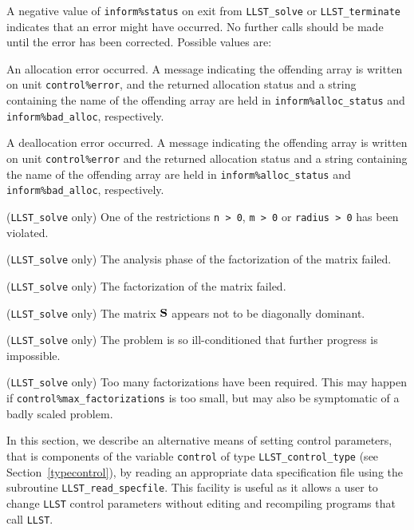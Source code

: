 \documentclass{galahad}
\newcommand{\packagename}{LLST}
\begin{document}

\galerrors
A negative value of  {\tt inform\%status} on exit from
{\tt \packagename\_solve}
or
{\tt \packagename\_terminate}
indicates that an error might have occurred. No further calls should be made
until the error has been corrected. Possible values are:

\begin{description}
 An allocation error occurred. A message indicating
the offending
array is written on unit {\tt control\%error}, and the returned allocation
status and a string containing the name of the offending array
are held in {\tt inform\%alloc\_\-status}
and {\tt inform\%bad\_alloc}, respectively.

 A deallocation error occurred.
A message indicating the offending
array is written on unit {\tt control\%error} and the returned allocation
status and a string containing the name of the offending array
are held in {\tt inform\%alloc\_\-status}
and {\tt inform\%bad\_alloc}, respectively.

 ({\tt \packagename\_solve} only)
One of the restrictions
{\tt n > 0},
{\tt m > 0}
or
{\tt radius > 0}
has been violated.

 ({\tt \packagename\_solve} only)
The analysis phase of the factorization of the matrix  failed.

 ({\tt \packagename\_solve} only)
The factorization of the matrix  failed.

 ({\tt \packagename\_solve} only)
The matrix ${\mathbf{S}}$ appears not to be diagonally dominant.

 ({\tt \packagename\_solve} only)
The problem is so ill-conditioned that further progress is impossible.

 ({\tt \packagename\_solve} only)
 Too many factorizations have been required.  This may happen if
    {\tt control\%max\_factorizations} is too small,
    but may also be symptomatic of a badly scaled problem.

\end{description}


\galfeatures
\noindent In this section, we describe an alternative means of setting
control parameters, that is components of the variable {\tt control} of type
{\tt \packagename\_control\_type}
(see Section~\ref{typecontrol}),
by reading an appropriate data specification file using the
subroutine {\tt \packagename\_read\_specfile}. This facility
is useful as it allows a user to change  {\tt \packagename} control parameters
without editing and recompiling programs that call {\tt \packagename}.
\end{document}
